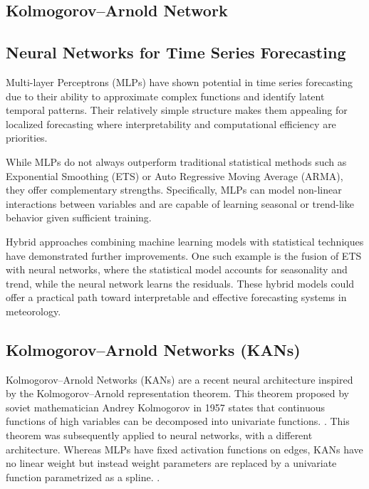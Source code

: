 \subsection{Kolmogorov–Arnold Network}

\subsection{Neural Networks for Time Series Forecasting}

Multi-layer Perceptrons (MLPs) have shown potential in time series forecasting due to their ability to approximate complex functions and identify latent temporal patterns.\cite{chen2023tsmixerallmlparchitecturetime} Their relatively simple structure makes them appealing for localized forecasting where interpretability and computational efficiency are priorities.

While MLPs do not always outperform traditional statistical methods such as Exponential Smoothing (ETS) or Auto Regressive Moving Average (ARMA), they offer complementary strengths.\cite{hewamalage2021recurrent} Specifically, MLPs can model non-linear interactions between variables and are capable of learning seasonal or trend-like behavior given sufficient training.

Hybrid approaches combining machine learning models with statistical techniques have demonstrated further improvements. One such example is the fusion of ETS with neural networks, where the statistical model accounts for seasonality and trend, while the neural network learns the residuals.\cite{panigrahi2017hybrid} These hybrid models could offer a practical path toward interpretable and effective forecasting systems in meteorology.

\subsection{Kolmogorov–Arnold Networks (KANs)}

Kolmogorov–Arnold Networks (KANs) are a recent neural architecture inspired by the Kolmogorov–Arnold representation theorem.
This theorem proposed by soviet mathematician Andrey Kolmogorov in 1957 states that continuous functions of high variables can be decomposed into univariate functions. \cite{kolmogorov1961representation}. 
This theorem was subsequently applied to neural networks, with a different architecture. Whereas MLPs have fixed activation functions on edges, KANs have no linear weight but instead weight parameters are replaced by a univariate function parametrized as a spline. \cite{somvanshi2024survey}. 

